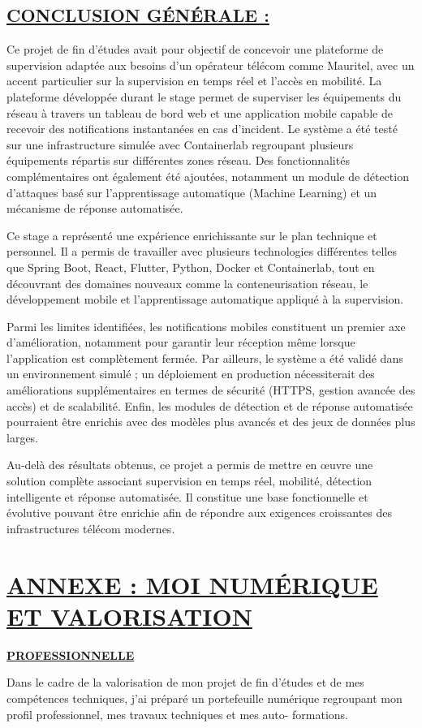 \documentclass[12pt,a4paper]{report}
\newcommand{\ub}[1]{\uline{\textbf{#1}}}
\begin{document}
\section*{\ub{CONCLUSION GÉNÉRALE :}}
Ce projet de fin d’études avait pour objectif de concevoir une plateforme de supervision adaptée aux besoins d’un opérateur télécom comme Mauritel, avec un accent particulier sur la supervision en temps réel et l’accès en mobilité. La plateforme développée durant le stage permet de superviser les équipements du réseau à travers un tableau de bord web et une application mobile capable de recevoir des notifications instantanées en cas d’incident. Le système a été testé sur une infrastructure simulée avec Containerlab regroupant plusieurs équipements répartis sur différentes zones réseau. Des fonctionnalités complémentaires ont également été ajoutées, notamment un module de détection d’attaques basé sur l’apprentissage automatique (Machine Learning) et un mécanisme de réponse automatisée.\par
Ce stage a représenté une expérience enrichissante sur le plan technique et personnel. Il a permis de travailler avec plusieurs technologies différentes telles que Spring Boot, React, Flutter, Python, Docker et Containerlab, tout en découvrant des domaines nouveaux comme la conteneurisation réseau, le développement mobile et l’apprentissage automatique appliqué à la supervision.\par
Parmi les limites identifiées, les notifications mobiles constituent un premier axe d’amélioration, notamment pour garantir leur réception même lorsque l’application est complètement fermée. Par ailleurs, le système a été validé dans un environnement simulé ; un déploiement en production nécessiterait des améliorations supplémentaires en termes de sécurité (HTTPS, gestion avancée des accès) et de scalabilité. Enfin, les modules de détection et de réponse automatisée pourraient être enrichis avec des modèles plus avancés et des jeux de données plus larges.\par
Au-delà des résultats obtenus, ce projet a permis de mettre en œuvre une solution complète associant supervision en temps réel, mobilité, détection intelligente et réponse automatisée. Il constitue une base fonctionnelle et évolutive pouvant être enrichie afin de répondre aux exigences croissantes des infrastructures télécom modernes.\par
\clearpage
\chapter*{\ub{ANNEXE : MOI NUMÉRIQUE ET VALORISATION}}
\ub{PROFESSIONNELLE}\par
Dans le cadre de la valorisation de mon projet de fin d’études et de mes compétences techniques, j’ai préparé un portefeuille numérique regroupant mon profil professionnel, mes travaux techniques et mes auto- formations.\par
\end{document}
